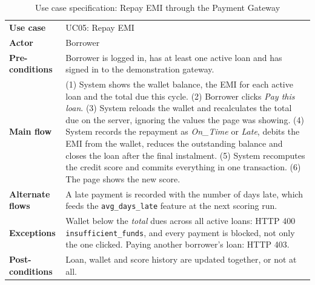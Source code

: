 \documentclass[11pt,a4paper]{article}
\newcommand{\code}[1]{\texttt{\small #1}}
\begin{document}
\begin{table}[H]
\centering
\caption{Use case specification: Repay EMI through the Payment Gateway}
\label{tab:uc5}
\small
\begin{tabular}{@{}L{3.1cm}L{11.3cm}@{}}
\toprule
\textbf{Use case} & UC05: Repay EMI\\
\textbf{Actor} & Borrower\\
\textbf{Pre-conditions} & Borrower is logged in, has at least one active loan and has signed in to the demonstration gateway.\\
\textbf{Main flow} & (1) System shows the wallet balance, the EMI for each active loan and the total due this cycle. (2) Borrower clicks \emph{Pay this loan}. (3) System reloads the wallet and recalculates the total due on the server, ignoring the values the page was showing. (4) System records the repayment as \emph{On\_Time} or \emph{Late}, debits the EMI from the wallet, reduces the outstanding balance and closes the loan after the final instalment. (5) System recomputes the credit score and commits everything in one transaction. (6) The page shows the new score.\\
\textbf{Alternate flows} & A late payment is recorded with the number of days late, which feeds the \code{avg\_days\_late} feature at the next scoring run.\\
\textbf{Exceptions} & Wallet below the \emph{total} dues across all active loans: HTTP 400 \code{insufficient\_funds}, and every payment is blocked, not only the one clicked. Paying another borrower's loan: HTTP 403.\\
\textbf{Post-conditions} & Loan, wallet and score history are updated together, or not at all.\\
\bottomrule
\end{tabular}
\end{table}
\end{document}
